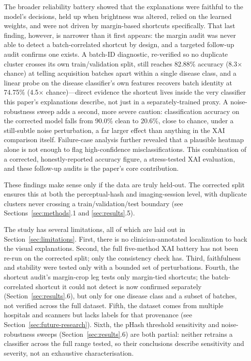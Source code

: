 The broader reliability battery showed that the explanations were faithful to the model's decisions, held up when brightness was altered, relied on the learned weights, and were not driven by margin-based shortcuts specifically. That last finding, however, is narrower than it first appears: the margin audit was never able to detect a batch-correlated shortcut by design, and a targeted follow-up audit confirms one exists. A batch-ID diagnostic, re-verified so no duplicate cluster crosses its own train/validation split, still reaches 82.88\% accuracy (8.3$\times$ chance) at telling acquisition batches apart within a single disease class, and a linear probe on the disease classifier's own features recovers batch identity at 74.75\% (4.5$\times$ chance)---direct evidence the shortcut lives inside the very classifier this paper's explanations describe, not just in a separately-trained proxy. A noise-robustness sweep adds a second, more severe caution: classification accuracy on the corrected model falls from 90.0\% clean to 20.6\%, close to chance, under a still-subtle noise perturbation, a far larger effect than anything in the XAI comparison itself. Failure-case analysis further revealed that a plausible heatmap alone is not enough to flag high-confidence misclassifications. This combination of a corrected, honestly-reported accuracy figure, a stress-tested XAI evaluation, and these follow-up audits is the paper's core contribution.

These findings make sense only if the data are truly held-out. The corrected split ensures this at both the perceptual-hash and imaging-session level, with duplicate clusters never crossing a train/validation/test boundary (see Sections~\ref{sec:methods}.1 and \ref{sec:results}.5).

The study has several limitations, all of which are laid out in Section~\ref{sec:limitations}. First, there is no clinician-annotated localization to back the visual explanations. Second, the full five-method XAI battery has not been re-run on the corrected split; only the consistency check has. Third, faithfulness and stability were tested only with a bounded set of perturbations. Fourth, the shortcut audit's margin-crop leg tests only margin-tied shortcuts; the batch-correlated shortcut it could not detect is now confirmed separately (Section~\ref{sec:results}.6), but only for one disease class and a subset of batches, not verified across the full dataset. Fifth, the dataset comes from multiple hospitals and scanners but lacks labels for that provenance (see Section~\ref{sec:future-research}). Sixth, the pHash threshold sensitivity and noise-robustness sweeps (Section~\ref{sec:results}.6) are both partial: neither retrains a classifier across the full range tested, so their conclusions describe sensitivity and severity, not an exhaustive characterisation.
